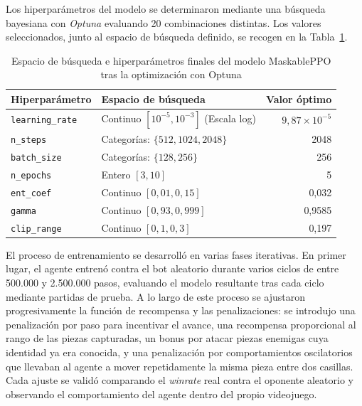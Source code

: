 Los hiperparámetros del modelo se determinaron mediante una búsqueda bayesiana con \textit{Optuna} evaluando 20 combinaciones distintas. Los valores seleccionados, junto al espacio de búsqueda definido, se recogen en la Tabla~\ref{tab:hparams}.

\begin{table}[H]
	\centering
	\begin{tabular}{|l|l|r|}
		\hline
		\textbf{Hiperparámetro} & \textbf{Espacio de búsqueda} & \textbf{Valor óptimo} \\
		\hline
		\texttt{learning\_rate} & Continuo $\left[10^{-5}, 10^{-3}\right]$ (Escala log) & $9{,}87 \times 10^{-5}$ \\
		\texttt{n\_steps}       & Categorías: $\{512, 1024, 2048\}$                      & 2048   \\
		\texttt{batch\_size}    & Categorías: $\{128, 256\}$                             & 256    \\
		\texttt{n\_epochs}      & Entero $\left[3, 10\right]$                            & 5      \\
		\texttt{ent\_coef}      & Continuo $\left[0{,}01, 0{,}15\right]$                 & 0,032  \\
		\texttt{gamma}          & Continuo $\left[0{,}93, 0{,}999\right]$                & 0,9585 \\
		\texttt{clip\_range}    & Continuo $\left[0{,}1, 0{,}3\right]$                   & 0,197  \\
		\hline
	\end{tabular}
	\caption{Espacio de búsqueda e hiperparámetros finales del modelo MaskablePPO tras la optimización con Optuna}
	\label{tab:hparams}
\end{table}

\clearpage

El proceso de entrenamiento se desarrolló en varias fases iterativas. En primer lugar, el agente entrenó contra el bot aleatorio durante varios ciclos de entre 500.000 y 2.500.000 pasos, evaluando el modelo resultante tras cada ciclo mediante partidas de prueba. A lo largo de este proceso se ajustaron progresivamente la función de recompensa y las penalizaciones: se introdujo una penalización por paso para incentivar el avance, una recompensa proporcional al rango de las piezas capturadas, un bonus por atacar piezas enemigas cuya identidad ya era conocida, y una penalización por comportamientos oscilatorios que llevaban al agente a mover repetidamente la misma pieza entre dos casillas. Cada ajuste se validó comparando el \textit{winrate} real contra el oponente aleatorio y observando el comportamiento del agente dentro del propio videojuego.


